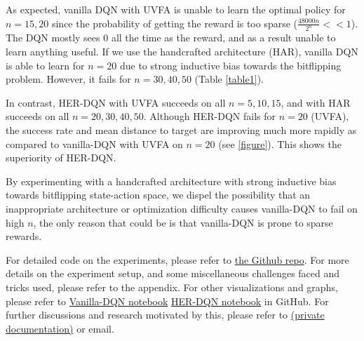 \documentclass{article}
\begin{document}
As expected, vanilla DQN with UVFA is unable to learn the optimal policy for $n=15,20$ since the probability of getting the reward is too sparse ($\frac{48000n}{2^n} << 1$). The DQN mostly sees $0$ all the time as the reward, and as a result unable to learn anything useful. If we use the handcrafted architecture (HAR), vanilla DQN is able to learn for $n=20$ due to strong inductive bias towards the bitflipping problem. However, it fails for $n=30,40,50$ (Table \ref{table1}). 

In contrast, HER-DQN with UVFA succeeds on all $n=5,10,15$, and with HAR succeeds on all $n=20,30,40,50$. Although HER-DQN fails for $n=20$ (UVFA), the success rate and mean distance to target are improving much more rapidly as compared to vanilla-DQN with UVFA on $n=20$ (see \ref{figure}). This shows the superiority of HER-DQN.

By experimenting with a handcrafted architecture with strong inductive bias towards bitflipping state-action space, we dispel the possibility that an inappropriate architecture or optimization difficulty causes vanilla-DQN to fail on high $n$, the only reason that could be is that vanilla-DQN is prone to sparse rewards. 

For detailed code on the experiments, please refer to \href{https://github.com/louis845/BitSeqRLToyProblem}{the Github repo}. For more details on the experiment setup, and some miscellaneous challenges faced and tricks used, please refer to the appendix. For other visualizations and graphs, please refer to \href{https://github.com/louis845/BitSeqRLToyProblem/blob/main/bitflipping_dqn_target_implementation.ipynb}{Vanilla-DQN notebook} \href{https://github.com/louis845/BitSeqRLToyProblem/blob/main/bitflipping_dqn_target_her_implementation.ipynb}{HER-DQN notebook} in GitHub. For further discussions and research motivated by this, please refer to \href{https://github.com/louis845/BitSeqRLToyProblemPrivateDocs/blob/master/docs/docs.pdf}{(private documentation)} or email. 
\end{document}
